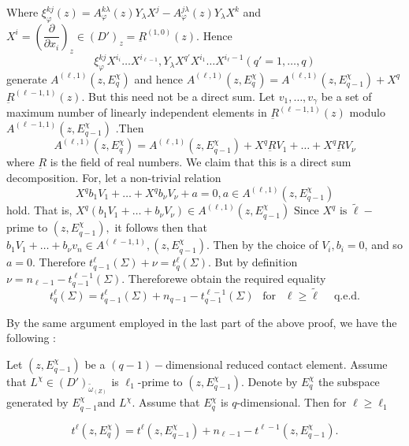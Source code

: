 Where $ \xi^{kj}_\varphi (z) = A^{k\lambda}_\varphi (z)Y_\lambda X^j -
A^{j\lambda} _\varphi (z) Y_\lambda X^k $ and $ X^i = \left(\dfrac
{\partial}{\partial x_i}\right)_z \in (D')_z = \underbar{R}^{(1,0)}(z)
$. Hence  
$$
\xi^{kj}_\varphi X^{i_i} \ldots X^{i_{\ell -1}}, Y_\lambda  X^{q'}
X^{i_1}\ldots X^{i_\ell-1}(q'= 1,\ldots,q) 
$$
generate $A^{(\ell,1)} (z,E^\chi_{q}) $ and hence $ A^{(\ell,1)}
(z,E^\chi_{q}) = A^{(\ell,1)}(z,E^\chi _{q-1}) + X^q$ \break
$\underbar{R}^{(\ell-1,1)} (z)$. But this need not be a direct sum. Let
$v_1,\ldots,v_\gamma$ be a set 
of maximum number of linearly independent elements in
$\underbar{R}^{(\ell-1,1)}(z)$ modulo $A^{(\ell-1,1)} (z,
E^\chi_{q-1})$ .Then  
$$
A^{(\ell,1)} (z,E^\chi _{q}) = A^{(\ell,1) }(z,E^\chi_{q-1}) +
X^q\underbar{R} V_1 + \ldots + X^q \underbar{R}V_\nu  
$$
where $\underbar{R}$ is the field of real numbers. We claim that this
is a direct sum decomposition. For, let a non-trivial relation  
$$
X^q b_1 V_1 + \ldots + X^q b_\nu V_\nu + a = 0 , a \in A^{(\ell , 1)}
(z, E^\chi _{q-1})  
$$
hold. That is, $ X^q (b_1 V_1 + \ldots + b_\nu V_\nu ) \in
A^{(\ell,1)} (z,E^\chi _{q-1}) \text{ Since } X^q \text{ is }
\tilde{\ell}-$ prime to $(z,E^\chi _{q-1}),$ it follows then that $
b_1 V_1 + \ldots + b_\nu v_n \in  A^{(\ell -1,1)},(z,E^\chi_{q-1})$. Then
by the choice of $ V_i, b_i=0$, and so $a =0$. Therefore
$t^\ell_{q-1} (\Sigma) + \nu = t^\ell_{q} (\Sigma)$. But by definition
$\nu =n_{\ell-1}- t^{\ell-1}_{q-1} (\Sigma)$. Therefore\pageoriginale we obtain the
required equality  
$$
t^\ell_{q}(\Sigma) = t^\ell _{q-1} (\Sigma) + n_{q-1} -
t^{\ell-1}_{q-1}(\Sigma) ~~\text{ for } ~~\ell \geq \tilde{\ell}~
\quad \text{q.e.d.} 
$$

By the same argument employed in the last part of the above proof, we
have the following :  
\begin{proposition}\label{chap3:sec3.12:prop22}%
  Let $(z,E^\chi _{q-1})$ be a $(q-1)-$dimensional reduced contact
  element. Assume that $L^\chi \in (D')_{\tilde{\omega}_{(Z)}}$ is
  $\ell_1$-prime to $(z,E^\chi_{q-1})$. Denote by $E^\chi _q$ the
  subspace generated by $E^\chi_{q-1}\text{and } L^\chi$. Assume that
  $E^\chi _q$ is $q$-dimensional. Then for $\ell \geq \ell_1$ 
\end{proposition}
$$
t^\ell(z,E^\chi_q) = t^\ell (z,E^\chi_{q-1})+ n_{\ell-1} - t^{\ell-1}
(z,E^\chi_{q-1}). 
$$

\section{}\label{chap3:sec3.13}%

